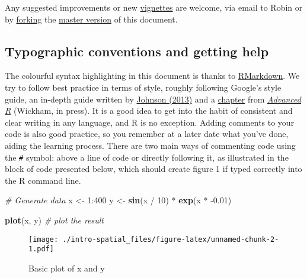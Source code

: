 \documentclass[]{article}
\newenvironment{Shaded}{}{}
\newcommand{\KeywordTok}[1]{\textcolor[rgb]{0.00,0.44,0.13}{\textbf{{#1}}}}
\newcommand{\DecValTok}[1]{\textcolor[rgb]{0.25,0.63,0.44}{{#1}}}
\newcommand{\FloatTok}[1]{\textcolor[rgb]{0.25,0.63,0.44}{{#1}}}
\newcommand{\StringTok}[1]{\textcolor[rgb]{0.25,0.44,0.63}{{#1}}}
\newcommand{\CommentTok}[1]{\textcolor[rgb]{0.38,0.63,0.69}{\textit{{#1}}}}
\newcommand{\NormalTok}[1]{{#1}}
\begin{document}
Any suggested improvements or new
\href{https://github.com/Robinlovelace/Creating-maps-in-R/tree/master/vignettes}{vignettes}
are welcome, via email to Robin or by
\href{https://help.github.com/articles/fork-a-repo}{forking} the
\href{https://github.com/Robinlovelace/Creating-maps-in-R/blob/master/intro-spatial.Rmd}{master
version} of this document.

\subsection{Typographic conventions and getting
help}\label{typographic-conventions-and-getting-help}

The colourful syntax highlighting in this document is thanks to
\href{http://rmarkdown.rstudio.com/}{RMarkdown}. We try to follow best
practice in terms of style, roughly following Google's style guide, an
in-depth guide written by
\href{http://cran.r-project.org/web/packages/rockchalk/vignettes/Rstyle.pdf}{Johnson
(2013)} and a \href{http://adv-r.had.co.nz/Style.html}{chapter} from
\href{http://adv-r.had.co.nz/}{\emph{Advanced R}} (Wickham, in press).
It is a good idea to get into the habit of consistent and clear writing
in any language, and R is no exception. Adding comments to your code is
also good practice, so you remember at a later date what you've done,
aiding the learning process. There are two main ways of commenting code
using the \texttt{\#} symbol: above a line of code or directly following
it, as illustrated in the block of code presented below, which should
create figure 1 if typed correctly into the R command line.

\begin{Shaded}
\begin{Highlighting}[]
\CommentTok{# Generate data}
\NormalTok{x <-}\StringTok{ }\DecValTok{1}\NormalTok{:}\DecValTok{400}
\NormalTok{y <-}\StringTok{ }\KeywordTok{sin}\NormalTok{(x /}\StringTok{ }\DecValTok{10}\NormalTok{) *}\StringTok{ }\KeywordTok{exp}\NormalTok{(x *}\StringTok{ }\NormalTok{-}\FloatTok{0.01}\NormalTok{)}

\KeywordTok{plot}\NormalTok{(x, y) }\CommentTok{# plot the result}
\end{Highlighting}
\end{Shaded}

\begin{figure}[htbp]
\centering
\texttt{[image: ./intro-spatial\_files/figure-latex/unnamed-chunk-2-1.pdf]}
\caption{Basic plot of x and y}
\end{figure}
\end{document}
